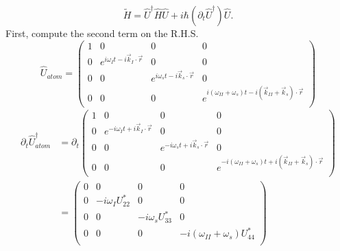 \documentclass[aps,pra,showpacs,amsmath,amssymb,nofootinbib,longbibliography,superscriptaddress
]{revtex4-1}
\theoremstyle{definition}
\theoremstyle{remark}
\newcommand{\0}{\hat{0}}
\begin{document}
\begin{equation}
    \tilde{H} = \hat{U}^{\dagger} \hat{H} \hat{U} + i \hbar (\partial_t \hat{U}^{\dagger}) \hat{U}.
\end{equation}
First, compute the second term on the R.H.S.
\begin{equation}
    \hat{U}_{atom} = \left(\begin{array}{cccc}
        1 & 0 & 0 & 0\\
        0 & e^{i \omega_I t - i \vec{k}_I \cdot \vec{r}} & 0 & 0\\
        0 & 0 & e^{i \omega_s t - i \vec{k}_s \cdot \vec{r}} & 0\\
        0 & 0 & 0 & e^{i(\omega_{II} + \omega_s) t - i(\vec{k}_{II} + \vec{k}_s) \cdot \vec{r}}\\
    \end{array}\right)
\end{equation}
\begin{align}
    \partial_t \hat{U}_{atom}^{\dagger} &= \partial_t \left(\begin{array}{cccc}
        1 & 0 & 0 & 0\\
        0 & e^{-i \omega_I t + i \vec{k}_I \cdot \vec{r}} & 0 & 0\\
        0 & 0 & e^{-i \omega_s t + i \vec{k}_s \cdot \vec{r}} & 0\\
        0 & 0 & 0 & e^{-i(\omega_{II} + \omega_s) t + i(\vec{k}_{II} + \vec{k}_s) \cdot \vec{r}}\\
    \end{array}\right) \nonumber \\
    &=\left(\begin{array}{cccc}
        0 & 0 & 0 & 0\\
        0 & -i \omega_I U_{22}^{*} & 0 & 0\\
        0 & 0 & -i \omega_s U_{33}^{*} & 0\\
        0 & 0 & 0 & -i(\omega_{II} + \omega_s)U_{44}^{*}\\
    \end{array}\right) \nonumber
\end{align}
\end{document}
